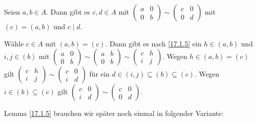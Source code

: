 \documentclass[../../main.tex]{subfiles}
\begin{document}
\begin{lem}\label{17.1.7}
Seien $a,b\in A$. Dann gibt es $c,d\in A$ mit $\begin{pmatrix*}a&0\\0&b\end{pmatrix*}\sim\begin{pmatrix*}c&0\\0&d\end{pmatrix*}$ mit $(c)=(a,b)$ und $c\mid d$.
\end{lem}
\begin{cproof}
Wähle $c\in A$ mit $(a,b)=(c)$. Dann gibt es nach \ref{17.1.5} ein $h\in (a,b)$ und $i,j\in (b)$ mit $\begin{pmatrix*}a&0\\0&b\end{pmatrix*}\sim\begin{pmatrix*}a&b\\0&b\end{pmatrix*}\sim\begin{pmatrix*}c&h\\i&j\end{pmatrix*}$. Wegen $h\in (a,b)=(c)$ gilt $\begin{pmatrix*}c&h\\i&j\end{pmatrix*}\sim \begin{pmatrix*}c&0\\i&d\end{pmatrix*}$ für ein $d\in (i,j)\subseteq(b)\subseteq(c)$. Wegen $i\in (b)\subseteq(c)$ gilt $\begin{pmatrix*}c&0\\i&d\end{pmatrix*}\sim \begin{pmatrix*}c&0\\0&d\end{pmatrix*}$.
\end{cproof}

Lemma \ref{17.1.5} brauchen wir später noch einmal in folgender Variante:
\end{document}
